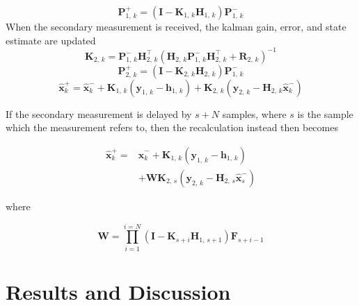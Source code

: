 \documentclass{ieeeaccess}
\begin{document}
	\begin{equation}
	\label{eq:p+}
		\boldsymbol{P}_{1,\,k}^{+} = \left(\boldsymbol{I} - \boldsymbol{K}_{1,\,k}\boldsymbol{H}_{1,\,k}\right)\boldsymbol{P}_{1,\,k}^{-}
	\end{equation}
	When the secondary measurement is received, the kalman gain, error, and state estimate are updated
	\begin{equation}
	\label{eq:K2}
		\boldsymbol{K}_{2,\,k} = \boldsymbol{P}_{1,\,k}^{-}\boldsymbol{H}_{2,\,k}^{\top}\left(\boldsymbol{H}_{2,\,k}\boldsymbol{P}_{1,\,k}^{-}\boldsymbol{H}_{2,\,k}^{\top} + \boldsymbol{R}_{2,\,k} \right)^{-1}
	\end{equation}
	\begin{equation}
	\label{eq:p2+}
		\boldsymbol{P}_{2,\,k}^{+} = \left(\boldsymbol{I} - \boldsymbol{K}_{2,\,k}\boldsymbol{H}_{2,\,k}\right)\boldsymbol{P}_{1,\,k}^{-}
	\end{equation}
	\begin{equation}
	\label{eq:x+sec}
		\hat{\boldsymbol{x}}_{k}^{+}=\hat{\boldsymbol{x}}_{k}^{-} + \boldsymbol{K}_{1,\,k}\left(\boldsymbol{y}_{1,\,k}- \boldsymbol{h}_{1,\,k}\right) + \boldsymbol{K}_{2,\,k}\left(\boldsymbol{y}_{2,\,k}-\boldsymbol{H}_{2,\,k}\hat{\boldsymbol{x}}_{k}^{-}\right)
	\end{equation}
	
	If the secondary measurement is delayed by $s+N$ samples, where $s$ is the sample which the measurement refers to, then the recalculation instead then becomes
	
	\begin{equation}
	\begin{aligned}
	\label{eq:x+del}
		\hat{\boldsymbol{x}}_{k}^{+}=&\hat{\boldsymbol{x}}_{k}^{-} + \boldsymbol{K}_{1,\,k}\left(\boldsymbol{y}_{1,\,k}- \boldsymbol{h}_{1,\,k}\right)	\\
		&+ \boldsymbol{W}\boldsymbol{K}_{2,\,s}\left(\boldsymbol{y}_{2,\,k}-\boldsymbol{H}_{2,\,s}\hat{\boldsymbol{x}}_{s}^{-}\right)
	\end{aligned}
	\end{equation}
	
	where
	
	\begin{equation}
	\label{eq:W}
		\boldsymbol{W} = \prod^{i=N}_{i=1}\left(\boldsymbol{I} - \boldsymbol{K}_{s+i}\boldsymbol{H}_{1,\,s+1}\right)\boldsymbol{F}_{s+i-1}
	\end{equation}
\section{Results and Discussion}
\label{sec:res}
\end{document}
